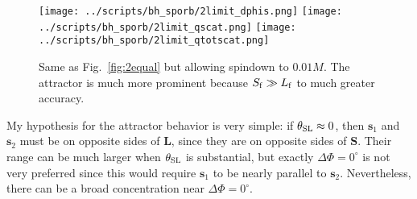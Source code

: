 \documentclass[11pt,
        usenames, %
        dvipsnames %
    ]{article}
\newcommand*{\bm}[1]{\boldsymbol{\mathbf{#1}}}
\newcommand*{\p}[1]{\left(#1\right)}
\begin{document}
\begin{figure}
    \centering
    \texttt{[image: ../scripts/bh\_sporb/2limit\_dphis.png]}
    \texttt{[image: ../scripts/bh\_sporb/2limit\_qscat.png]}
    \texttt{[image: ../scripts/bh\_sporb/2limit\_qtotscat.png]}
    \caption{Same as Fig.~\ref{fig:2equal} but allowing spindown to
    $0.01M$. The attractor is much more prominent because $S_{\rm f} \gg L_{\rm
    f}$ to much greater accuracy.}\label{fig:2limit}
\end{figure}

My hypothesis for the attractor behavior is very simple: if $\theta_{\rm SL}
\approx 0$, then $\bm{s}_1$ and $\bm{s}_2$ must be on opposite sides of
$\bm{L}$, since they are on opposite sides of $\bm{S}$. Their range can be much
larger when $\theta_{\rm SL}$ is substantial, but exactly $\Delta \Phi =
0^\circ$ is not very preferred since this would require $\bm{s}_1$ to be nearly
parallel to $\bm{s}_2$. Nevertheless, there can be a broad concentration near
$\Delta \Phi = 0^\circ$.

\end{document}
